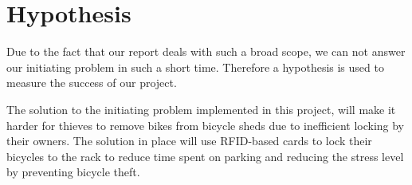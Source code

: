\section{Hypothesis}

Due to the fact that our report deals with such a broad scope, we can not answer our initiating problem in such a short time. Therefore a hypothesis is used to measure the success of our project. 

The solution to the initiating problem implemented in this project, will make it harder for thieves to remove bikes from bicycle sheds due to inefficient locking by their owners. The solution in place will use RFID-based cards to lock their bicycles to the rack to reduce time spent on parking and reducing the stress level by preventing bicycle theft.

